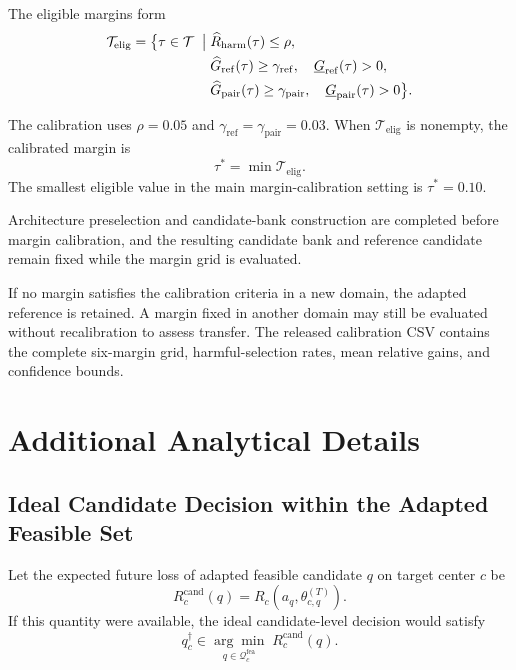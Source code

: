 \documentclass[11pt,a4paper]{article}
\begin{document}
The eligible margins form
\begin{equation}
\begin{aligned}
\mathcal{T}_{\mathrm{elig}}
=
\bigl\{
\tau\in\mathcal{T}
\;\bigm|\;&
\widehat R_{\mathrm{harm}}(\tau)\leq\rho,
\\
&
\widehat G_{\mathrm{ref}}(\tau)\geq\gamma_{\mathrm{ref}},
\quad
\underline G_{\mathrm{ref}}(\tau)>0,
\\
&
\widehat G_{\mathrm{pair}}(\tau)\geq\gamma_{\mathrm{pair}},
\quad
\underline G_{\mathrm{pair}}(\tau)>0
\bigr\}.
\end{aligned}
\label{eq:supp-margin-calibration}
\end{equation}

The calibration uses
$\rho=0.05$ and
$\gamma_{\mathrm{ref}}=\gamma_{\mathrm{pair}}=0.03$.
When $\mathcal{T}_{\mathrm{elig}}$ is nonempty, the calibrated margin is
\begin{equation}
\tau^{*}=\min \mathcal{T}_{\mathrm{elig}}.
\end{equation}
The smallest eligible value in the main margin-calibration setting is
$\tau^{*}=0.10$.

Architecture preselection and candidate-bank construction are completed before
margin calibration, and the resulting candidate bank and reference candidate
remain fixed while the margin grid is evaluated.

If no margin satisfies the calibration criteria in a new domain, the adapted
reference is retained. A margin fixed in another domain may still be
evaluated without recalibration to assess transfer. The released calibration
CSV contains the complete six-margin grid,
harmful-selection rates, mean relative gains, and confidence bounds.

\section{Additional Analytical Details}
\label{supp:analysis}

\subsection{Ideal Candidate Decision within the Adapted Feasible Set}

Let the expected future loss of adapted feasible candidate $q$ on target
center $c$ be
\begin{equation}
R_c^{\mathrm{cand}}(q)
=
R_c\left(a_q,\theta_{c,q}^{(T)}\right).
\label{eq:supp-candidate-risk}
\end{equation}
If this quantity were available, the ideal candidate-level decision would
satisfy
\begin{equation}
q_c^{\dagger}
\in
\underset{q\in\mathcal{Q}_{c}^{\mathrm{fea}}}
{\arg\min}\;
R_c^{\mathrm{cand}}(q).
\label{eq:supp-ideal-target}
\end{equation}
\end{document}
